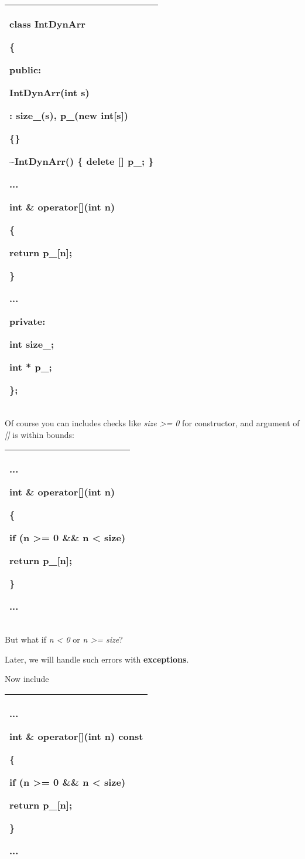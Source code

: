 \documentclass[
]{article}
\begin{document}
\begin{longtable}[]{@{}l@{}}
\toprule
\endhead
\begin{minipage}[t]{0.97\columnwidth}\raggedright
class IntDynArr

\{

public:

IntDynArr(int s)

: size\_(s), p\_(new int{[}s{]})

\{\}

\textasciitilde IntDynArr() \{ delete {[}{]} p\_; \}

...

\textbf{int \& operator{[}{]}(int n)}

\{

return p\_{[}n{]};

\}

...

private:

int size\_;

int * p\_;

\};\strut
\end{minipage}\tabularnewline
\bottomrule
\end{longtable}

Of course you can includes checks like \emph{size \textgreater= 0} for
constructor, and argument of \emph{{[}{]}} is within bounds:

\begin{longtable}[]{@{}l@{}}
\toprule
\endhead
\begin{minipage}[t]{0.97\columnwidth}\raggedright
...

int \& operator{[}{]}(int n)

\{

if (n \textgreater= 0 \&\& n \textless{} size)

return p\_{[}n{]};

\}

...\strut
\end{minipage}\tabularnewline
\bottomrule
\end{longtable}

But what if \emph{n \textless{} 0} or \emph{n \textgreater= size}?

Later, we will handle such errors with \textbf{exceptions}.

Now include

\begin{longtable}[]{@{}l@{}}
\toprule
\endhead
\begin{minipage}[t]{0.97\columnwidth}\raggedright
...

int \& operator{[}{]}(int n) const

\{

if (n \textgreater= 0 \&\& n \textless{} size)

return p\_{[}n{]};

\}

...\strut
\end{minipage}\tabularnewline
\bottomrule
\end{longtable}
\end{document}
